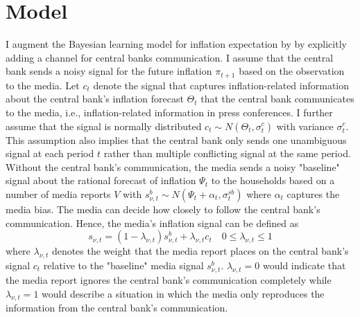 \documentclass[review]{elsarticle}
\begin{document}
\section{Model}\label{sec:Model} 
I augment the Bayesian learning model for inflation expectation by \cite{LamlaLein2014} by explicitly adding a channel for central banks communication. I assume that the central bank sends a noisy signal for the future inflation $\pi_{t+1}$ based on the observation to the media. Let $c_t$ denote the signal that captures inflation-related information about the central bank's inflation forecast $\Theta_t$ that the central bank communicates to the media, i.e., inflation-related information in press conferences. I further assume that the signal is normally distributed $c_t \sim N(\Theta_t, \sigma^c_t)$ with variance $\sigma^c_t$. This assumption also implies that the central bank only sends one unambiguous signal at each period $t$ rather than multiple conflicting signal at the same period.
Without the central bank's communication, the media sends a noisy "baseline" signal about the rational forecast of inflation $\Psi_t$ to the households based on a number of media reports $V$ with $s^b_{\nu,t} \sim N(\Psi_t + \alpha_t, \sigma^{sb}_t) $ 
where $\alpha_t$ captures the media bias. %
The media can decide how closely to follow the central bank's communication. Hence, the media's inflation signal can be defined as 
\begin{equation}
s_{\nu,t} = (1-\lambda_{\nu,t}) s^b_{\nu,t} + \lambda_{\nu,t} c_t \quad 0\leq \lambda_{\nu,t} \leq 1
\end{equation}
where $\lambda_{\nu, t}$ denotes the weight that the media report places on the central bank's signal $c_t$ relative to the "baseline" media signal $s^b_{\nu,t}$. $\lambda_{\nu,t} = 0$ would indicate that the media report ignores the central bank's communication completely while $\lambda_{\nu,t} = 1$ would describe a situation in which the media only reproduces the information from the central bank's communication. 
\end{document}
